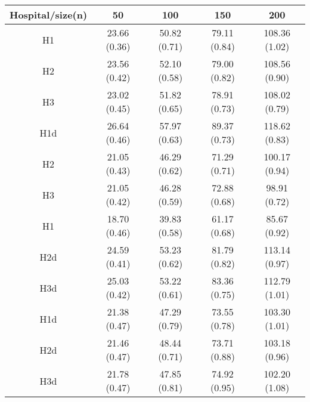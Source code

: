 \begin{center}
\begin{tabular}{c | c | c | c | c}
Hospital/size(n) & 50 & 100 & 150 & 200\\ \hline
H1 & 23.66 (0.36) & 50.82 (0.71) & 79.11 (0.84) & 108.36 (1.02) \\
H2 & 23.56 (0.42) & 52.10 (0.58) & 79.00 (0.82) & 108.56 (0.90) \\
H3 & 23.02 (0.45) & 51.82 (0.65) & 78.91 (0.73) & 108.02 (0.79) \\
H1d & 26.64 (0.46) & 57.97 (0.63) & 89.37 (0.73) & 118.62 (0.83) \\
H2 & 21.05 (0.43) & 46.29 (0.62) & 71.29 (0.71) & 100.17 (0.94) \\
H3 & 21.05 (0.42) & 46.28 (0.59) & 72.88 (0.68) & 98.91 (0.72) \\
H1 & 18.70 (0.46) & 39.83 (0.58) & 61.17 (0.68) & 85.67 (0.92) \\
H2d & 24.59 (0.41) & 53.23 (0.62) & 81.79 (0.82) & 113.14 (0.97) \\
H3d & 25.03 (0.42) & 53.22 (0.61) & 83.36 (0.75) & 112.79 (1.01) \\
H1d & 21.38 (0.47) & 47.29 (0.79) & 73.55 (0.78) & 103.30 (1.01) \\
H2d & 21.46 (0.47) & 48.44 (0.71) & 73.71 (0.88) & 103.18 (0.96) \\
H3d & 21.78 (0.47) & 47.85 (0.81) & 74.92 (0.95) & 102.20 (1.08) \\
\end{tabular}
\end{center}
